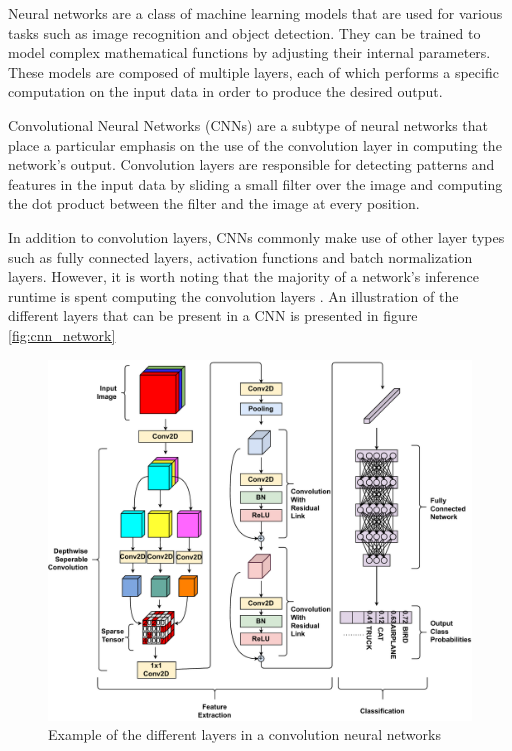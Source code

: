 Neural networks are a class of machine learning models that are used for various
tasks such as image recognition and object detection. They can be trained to
model complex mathematical functions by adjusting their internal parameters.
These models are composed of multiple layers, each of which performs a specific
computation on the input data in order to produce the desired output.

Convolutional Neural Networks (CNNs) are a subtype of neural networks that place
a particular emphasis on the use of the convolution layer in computing the
network's output. Convolution layers are responsible for detecting patterns and
features in the input data by sliding a small filter over the image and
computing the dot product between the filter and the image at every position.

In addition to convolution layers, CNNs commonly make use of other layer types
such as fully connected layers, activation functions and batch normalization
layers. However, it is worth noting that the majority of a network's inference
runtime is spent computing the convolution layers \cite{most_of_the_runtime}. An
illustration of the different layers that can be present in a CNN is presented
in figure \autoref{fig:cnn_network}


\begin{figure}[ht]
    \centering
    \includegraphics[scale=0.4]{fig/cnn.pdf}
    \caption{Example of the different layers in a convolution neural networks}
    \label{fig:cnn_network}
\end{figure}


